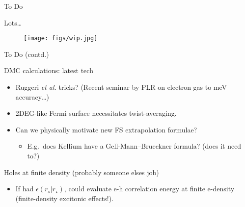 \documentclass[10pt, pdf, hyperref={draft}, usenames, dvipsnames]{beamer}
\begin{document}


\begin{frame}{To Do}

\begin{block}{Lots\ldots}
 \begin{figure}[H]
   \centering
   \texttt{[image: figs/wip.jpg]}
 \end{figure}
\end{block}

\end{frame}

\begin{frame}{To Do (contd.)}

  \begin{block}{DMC calculations: latest tech}
    \begin{itemize}
      \item Ruggeri \textit{et al.} tricks? (Recent seminar by PLR on electron gas to
      meV accuracy\ldots)
      \item 2DEG-like Fermi surface necessitates twist-averaging.
      \item Can we physically motivate new FS extrapolation formulae?
      \begin{itemize}
        \item E.g.~does Kellium have a Gell-Mann--Brueckner formula? (does it need to?)
      \end{itemize}
    \end{itemize}
  \end{block}

  \begin{block}{Holes at finite density (probably someone elses job)}
    \begin{itemize}
      \item If had $\epsilon(r_s|r_{\star})$, could evaluate e-h correlation
      energy at finite e-density (finite-density excitonic effects!).
    \end{itemize}
  \end{block}
\end{frame}

\end{document}
